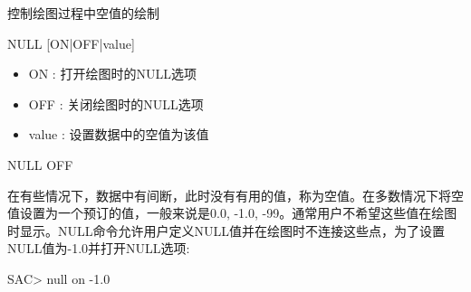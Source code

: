 \label{cmd:null}

控制绘图过程中空值的绘制

\begin{SACSTX}
NULL [ON|OFF|value]
\end{SACSTX}

\begin{itemize}
\item ON :  打开绘图时的NULL选项 
\item OFF : 关闭绘图时的NULL选项 
\item value : 设置数据中的空值为该值 
\end{itemize}

\begin{SACDFT}
NULL OFF
\end{SACDFT}

在有些情况下，数据中有间断，此时没有有用的值，称为空值。在多数情况下将空值设置为一个预订的值，一般来说是0.0, -1.0, -99。通常用户不希望这些值在绘图时显示。NULL命令允许用户定义NULL值并在绘图时不连接这些点，为了设置NULL值为-1.0并打开NULL选项:
\begin{SACCode}
SAC> null on -1.0
\end{SACCode}
